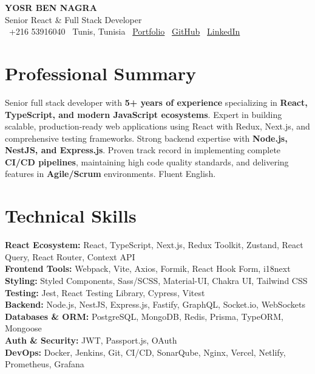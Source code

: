 \documentclass[10pt,a4paper]{article}
\begin{document}
\begin{center}
  {\Large\bfseries\color{primary} YOSR BEN NAGRA}\\[2pt]
  {\small\color{darkgray} Senior React \& Full Stack Developer}\\[3pt]
  {\footnotesize
    \faPhone\ +216 53916040 \quad
    \faMapMarker*\ Tunis, Tunisia \quad
    \faGlobe\ \href{https://portfolio-yosr.vercel.app/en}{Portfolio} \quad
    \faGithub\ \href{https://github.com/YosrBennagra}{GitHub} \quad
    \faLinkedin\ \href{https://www.linkedin.com/in/yosr-ben-nagra/}{LinkedIn}
  }
\end{center}

\vspace{3pt}

\section*{Professional Summary}
\vspace{1pt}
{\small
Senior full stack developer with \textbf{5+ years of experience} specializing in \textbf{React, TypeScript, and modern JavaScript ecosystems}. Expert in building scalable, production-ready web applications using React with Redux, Next.js, and comprehensive testing frameworks. Strong backend expertise with \textbf{Node.js, NestJS, and Express.js}. Proven track record in implementing complete \textbf{CI/CD pipelines}, maintaining high code quality standards, and delivering features in \textbf{Agile/Scrum} environments. Fluent English.
}

\vspace{5pt}

\section*{Technical Skills}
\vspace{2pt}
{\small
\textbf{React Ecosystem:} React, TypeScript, Next.js, Redux Toolkit, Zustand, React Query, React Router, Context API\\[2pt]
\textbf{Frontend Tools:} Webpack, Vite, Axios, Formik, React Hook Form, i18next\\[2pt]
\textbf{Styling:} Styled Components, Sass/SCSS, Material-UI, Chakra UI, Tailwind CSS\\[2pt]
\textbf{Testing:} Jest, React Testing Library, Cypress, Vitest\\[2pt]
\textbf{Backend:} Node.js, NestJS, Express.js, Fastify, GraphQL, Socket.io, WebSockets\\[2pt]
\textbf{Databases \& ORM:} PostgreSQL, MongoDB, Redis, Prisma, TypeORM, Mongoose\\[2pt]
\textbf{Auth \& Security:} JWT, Passport.js, OAuth\\[2pt]
\textbf{DevOps:} Docker, Jenkins, Git, CI/CD, SonarQube, Nginx, Vercel, Netlify, Prometheus, Grafana
}
\end{document}
